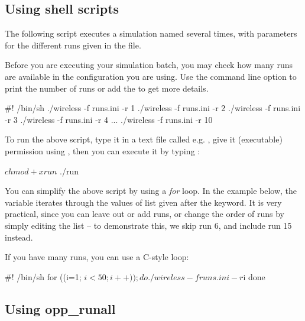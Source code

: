 \subsection{Using shell scripts}

The following script executes a simulation named 
several times, with parameters for the different runs
given in the  file.

Before you are executing your simulation batch, you may check how many
runs are available in the configuration you are using. Use the
 command line option to print the number of runs or
add the  to get more details.

\begin{filelisting}
#! /bin/sh
./wireless -f runs.ini -r 1
./wireless -f runs.ini -r 2
./wireless -f runs.ini -r 3
./wireless -f runs.ini -r 4
...
./wireless -f runs.ini -r 10
\end{filelisting}

To run the above script, type it in a text file called e.g. ,
give it  (executable) permission using ,
then you can execute it by typing :

\begin{commandline}
$ chmod +x run
$ ./run
\end{commandline}

You can simplify the above script by using a \textit{for} loop.
In the example below, the variable  iterates through
the values of list given after the  keyword.
It is very practical, since you can leave out or add runs,
or change the order of runs by simply editing the list --
to demonstrate this, we skip run 6, and include run 15 instead.


If you have many runs, you can use a C-style loop:

\begin{filelisting}
#! /bin/sh
for ((i=1; $i<50; i++)); do
   ./wireless -f runs.ini -r $i
done
\end{filelisting}

\subsection{Using opp\_runall}

